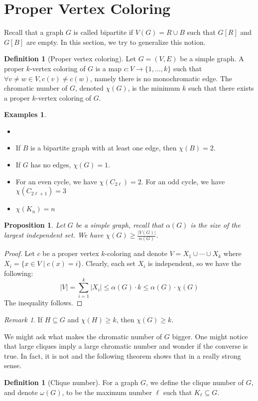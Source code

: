 \documentclass{tufte-handout}
\newtheorem{prop}[thm]{Proposition}
\theoremstyle{definition}
\newtheorem{defn}[thm]{Definition}
\newtheorem{exmps}[thm]{Examples}
\theoremstyle{remark}
\newtheorem{rem}[thm]{Remark}
\begin{document}
\section{Proper Vertex Coloring}
Recall that a graph $G$ is called bipartite if $V(G) = R \cup B$ such that $G[R]$ and $G[B]$ are empty. In this section, we try to generalize this notion.
\begin{defn}[Proper vertex coloring]
	Let $G = (V,E)$ be a simple graph. A proper $k$-vertex coloring of $G$ is a map $c: V \rightarrow \{1,\dots, k\}$ such that $\forall v \neq w \in V, c(v) \neq c(w)$, namely there is no monochromatic edge. The chromatic number of $G$, denoted $\chi(G)$, is the minimum $k$ such that there exists a proper $k$-vertex coloring of $G$.
\end{defn}
\begin{exmps}
	\begin{itemize}\item[]
		\item If $B$ is a bipartite graph with at least one edge, then $\chi(B) = 2$.
		\item If $G$ has no edges, $\chi(G) = 1$.
		\item For an even cycle, we have $\chi(C_{2\ell}) = 2$. For an odd cycle, we have $\chi(C_{2\ell + 1}) = 3$
		\item $\chi(K_n) = n$
	\end{itemize}
\end{exmps}
\begin{prop}
	Let $G$ be a simple graph, recall that $\alpha(G)$ is the size of the largest independent set. We have $\chi(G) \geq \frac{|V(G)|}{\alpha(G)}$.
\end{prop}
\begin{proof}
	Let $c$ be a proper vertex $k$-coloring and denote $V = X_1 \cup \cdots \cup X_k$ where $X_i = \{x \in V \mid c(x) = i\}$. Clearly, each set $X_i$ is independent, so we have the following:
	\[ |V| = \sum_{i=1}^k |X_i| \leq \alpha(G) \cdot k \leq \alpha(G) \cdot \chi(G) \]
	The inequality follows.
\end{proof}
\begin{rem}
	If $H \subseteq G$ and $\chi(H) \geq k$, then $\chi(G) \geq k$.
\end{rem}
We might ask what makes the chromatic number of $G$ bigger. One might notice that large cliques imply a large chromatic number and wonder if the converse is true. In fact, it is not and the following theorem shows that in a really strong sense.
\begin{defn}[Clique number]
	For a graph $G$, we define the clique number of $G$, and denote $\omega(G)$, to be the maximum number $\ell$ such that $K_{\ell} \subseteq G$.
\end{defn}
\end{document}
